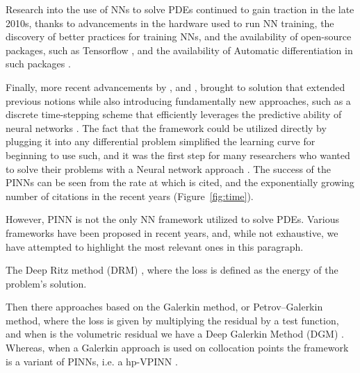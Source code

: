 \documentclass[pdflatex,sn-basic]{sn-jnl}%
\theoremstyle{thmstyleone}%
\theoremstyle{thmstyletwo}%
\theoremstyle{thmstylethree}%
\begin{document}
Research into the use of NNs to solve PDEs continued to gain traction in the late 2010s, thanks to advancements in the hardware used to run NN training, the discovery of better practices for training NNs, and the availability of open-source packages, such as Tensorflow \citep{Hag2021_SciannKerastensorflowWrapper_JuaHJ}, and the availability of Automatic differentiation in such packages \citep{Pas2017_AutomaticDifferentiationPytorch_GroPGC}.

Finally, more recent advancements by 
\cite{Kon2018_GeneralizationEquivarianceConvolution_TriKT}, %
and 
\cite{Mal2016_UnderstandingDeepConvolutional_Mal}, %
brought to %
\cite{Rai2019_PhysicsInformedNeural_PerRPK} solution that extended previous notions while also introducing fundamentally new approaches, such as a discrete time-stepping scheme that efficiently leverages the predictive ability of neural networks  \citep{Kol2021_PhysicsInformedNeural_DAKDJH}.
The fact that the framework could be utilized directly by plugging it into any differential problem simplified the learning curve for beginning to use such, and it was the first step for many researchers who wanted to solve  their problems with a Neural network approach \citep{Mar2021_OldNewCan_Mar}. 
The success of the PINNs can be seen from the rate at which \cite{Rai2019_PhysicsInformedNeural_PerRPK} is cited, and the exponentially growing number of citations in the recent years (Figure~\ref{fig:time}).




However, PINN is not the only NN framework utilized to solve PDEs.
Various frameworks have been proposed in recent years,  and, while not exhaustive, we have attempted to highlight the most relevant ones in this paragraph. 

The Deep Ritz method (DRM) \citep{Wei2018_DeepRitzMethod_YuWY}, where the loss is defined as the energy of the problem's solution.

Then there approaches based on the Galerkin method, or Petrov–Galerkin method, where the loss is given by multiplying the residual by a test function, and when is the volumetric residual we have a Deep Galerkin Method (DGM) \citep{Sir2018_DgmDeepLearning_SpiSS}.
Whereas, when a Galerkin approach is used on collocation points the framework is a variant of PINNs, i.e. a hp-VPINN \cite{Kha2021_HpVpinnsVariational_ZhaKZK}.
\end{document}
